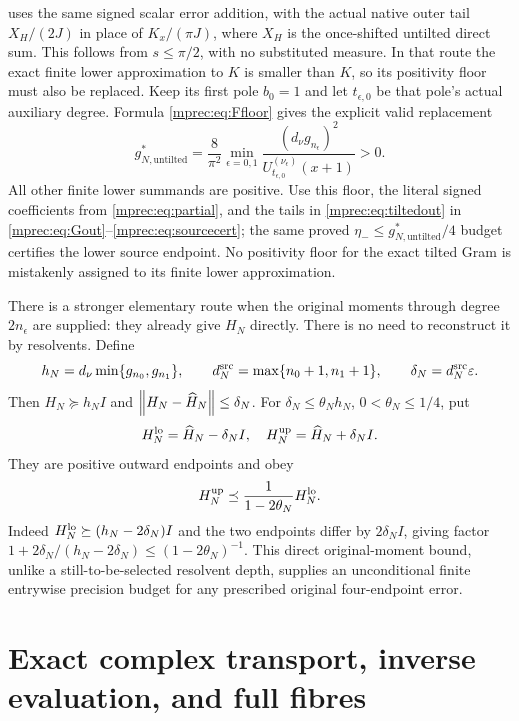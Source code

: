 uses the same signed scalar error addition, with the actual native
outer tail $X_H/(2J)$ in place of $K_x/(\pi J)$, where $X_H$
is the once-shifted untilted direct sum. This follows from
$s\le\pi/2$, with no substituted measure. In that route the
exact finite lower approximation to $K$ is smaller than $K$,
so its positivity floor must also be replaced. Keep its first
pole $b_0=1$ and let $t_{\epsilon,0}$ be that pole's actual
auxiliary degree. Formula \eqref{mprec:eq:Ffloor} gives the explicit
valid replacement
\[
 g_{N,\mathrm{untilted}}^*
 =\frac8{\pi^2}\min_{\epsilon=0,1}
 \frac{(d_\nu g_{n_\epsilon})^2}
 {U_{t_{\epsilon,0}}^{(\nu_\epsilon)}(x+1)}>0.
\]
All other finite lower summands are positive. Use this floor,
the literal signed coefficients from \eqref{mprec:eq:partial}, and
the tails in \eqref{mprec:eq:tiltedout} in
\eqref{mprec:eq:Gout}--\eqref{mprec:eq:sourcecert}; the same proved
$\eta_-\le g_{N,\mathrm{untilted}}^*/4$ budget certifies the
lower source endpoint. No positivity floor for the exact tilted
Gram is mistakenly assigned to its finite lower approximation.

There is a stronger elementary route when the original moments
through degree $2n_\epsilon$ are supplied: they already give
$H_N$ directly. There is no need to reconstruct it by resolvents.
Define
\begin{equation}\label{mprec:eq:directconstants}
 h_N=d_\nu\min\{g_{n_0},g_{n_1}\},\qquad
 d_N^{\rm src}=\max\{n_0+1,n_1+1\},\qquad
 \delta_N=d_N^{\rm src}\varepsilon.
\end{equation}
Then $H_N\succeq h_NI$ and $\left\lVert H_N-\widehat H_N\right\rVert\le\delta_N$.
For $\delta_N\le\theta_Nh_N$, $0<\theta_N\le1/4$, put
\begin{equation}\label{mprec:eq:directout}
 H_N^{\rm lo}=\widehat H_N-\delta_NI,\quad
 H_N^{\rm up}=\widehat H_N+\delta_NI.
\end{equation}
They are positive outward endpoints and obey
\begin{equation}\label{mprec:eq:directrelative}
 H_N^{\rm up}\preceq\frac1{1-2\theta_N}H_N^{\rm lo}.
\end{equation}
Indeed $H_N^{\rm lo}\succeq(h_N-2\delta_N)I$ and the two
endpoints differ by $2\delta_NI$, giving factor
$1+2\delta_N/(h_N-2\delta_N)\le(1-2\theta_N)^{-1}$.
This direct original-moment bound, unlike a still-to-be-selected
resolvent depth, supplies an unconditional finite entrywise
precision budget for any prescribed original four-endpoint error.

\section{Exact complex transport, inverse evaluation, and full fibres}

